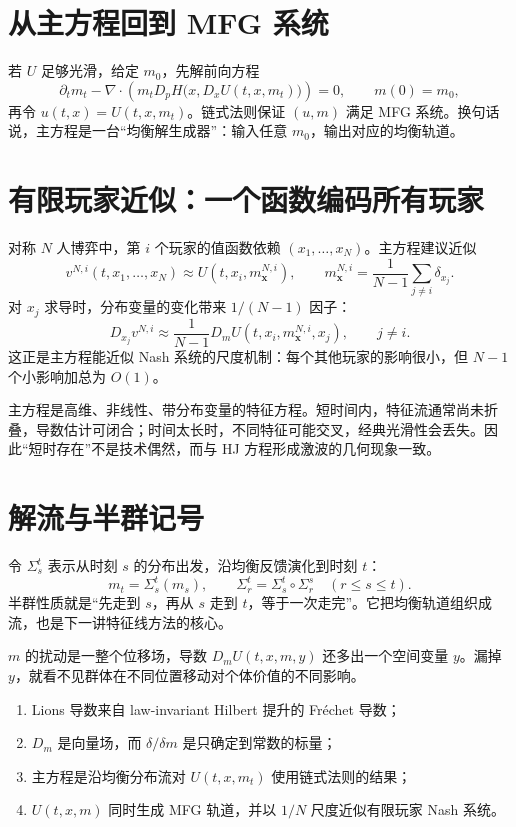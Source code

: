 \section{从主方程回到 MFG 系统}

若 $U$ 足够光滑，给定 $m_0$，先解前向方程
\[
\partial_t m_t-\nabla\cdot\left(m_tD_pH\bigl(x,D_xU(t,x,m_t)\bigr)\right)=0,
\qquad m(0)=m_0,
\]
再令 $u(t,x)=U(t,x,m_t)$。链式法则保证 $(u,m)$ 满足 MFG 系统。换句话说，主方程是一台“均衡解生成器”：输入任意 $m_0$，输出对应的均衡轨道。

\section{有限玩家近似：一个函数编码所有玩家}

对称 $N$ 人博弈中，第 $i$ 个玩家的值函数依赖 $(x_1,\ldots,x_N)$。主方程建议近似
\[
v^{N,i}(t,x_1,\ldots,x_N)
\approx U\!\left(t,x_i,m_{\symbf{x}}^{N,i}\right),
\qquad
m_{\symbf{x}}^{N,i}=\frac1{N-1}\sum_{j\ne i}\delta_{x_j}.
\]
对 $x_j$ 求导时，分布变量的变化带来 $1/(N-1)$ 因子：
\[
D_{x_j}v^{N,i}
\approx\frac1{N-1}D_mU\!\left(t,x_i,m_{\symbf{x}}^{N,i},x_j\right),
\qquad j\ne i.
\]
这正是主方程能近似 Nash 系统的尺度机制：每个其他玩家的影响很小，但 $N-1$ 个小影响加总为 $O(1)$。

\begin{intuition}[为什么常先得到短时经典解]
主方程是高维、非线性、带分布变量的特征方程。短时间内，特征流通常尚未折叠，导数估计可闭合；时间太长时，不同特征可能交叉，经典光滑性会丢失。因此“短时存在”不是技术偶然，而与 HJ 方程形成激波的几何现象一致。
\end{intuition}

\section{解流与半群记号}

令 $\Sigma_s^t$ 表示从时刻 $s$ 的分布出发，沿均衡反馈演化到时刻 $t$：
\[
m_t=\Sigma_s^t(m_s),\qquad
\Sigma_r^t=\Sigma_s^t\circ\Sigma_r^s
\quad(r\le s\le t).
\]
半群性质就是“先走到 $s$，再从 $s$ 走到 $t$，等于一次走完”。它把均衡轨道组织成流，也是下一讲特征线方法的核心。

\begin{pitfall}
$m$ 的扰动是一整个位移场，导数 $D_mU(t,x,m,y)$ 还多出一个空间变量 $y$。漏掉 $y$，就看不见群体在不同位置移动对个体价值的不同影响。
\end{pitfall}

\begin{takeaway}
\begin{enumerate}
  \item Lions 导数来自 law-invariant Hilbert 提升的 Fréchet 导数；
  \item $D_m$ 是向量场，而 $\delta/\delta m$ 是只确定到常数的标量；
  \item 主方程是沿均衡分布流对 $U(t,x,m_t)$ 使用链式法则的结果；
  \item $U(t,x,m)$ 同时生成 MFG 轨道，并以 $1/N$ 尺度近似有限玩家 Nash 系统。
\end{enumerate}
\end{takeaway}

